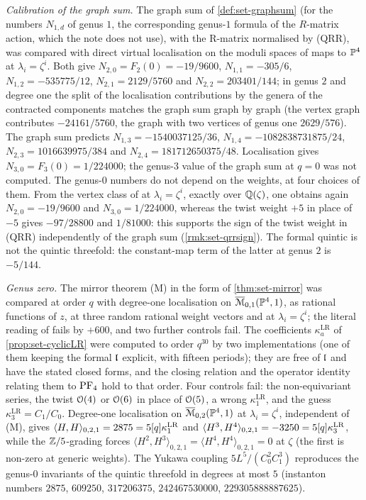 \emph{Calibration of the graph sum.} The graph sum of \cref{def:set-graphsum} (for the numbers $N_{1,d}$ of genus $1$, the corresponding genus-$1$ formula of the $R$-matrix action, which the note does not use), with the R-matrix normalised by (QRR), was compared with direct virtual localisation \cite{MR1666787} on the moduli spaces of maps to $\mathbb{P}^4$ at $\lambda_i=\zeta^i$. Both give $N_{2,0}=F_2(0)=-19/9600$, $N_{1,1}=-305/6$, $N_{1,2}=-535775/12$, $N_{2,1}=2129/5760$ and $N_{2,2}=203401/144$; in genus $2$ and degree one the split of the localisation contributions by the genera of the contracted components matches the graph sum graph by graph (the vertex graph contributes $-24161/5760$, the graph with two vertices of genus one $2629/576$). The graph sum predicts $N_{1,3}=-1540037125/36$, $N_{1,4}=-1082838731875/24$, $N_{2,3}=1016639975/384$ and $N_{2,4}=181712650375/48$. Localisation gives $N_{3,0}=F_3(0)=1/224000$; the genus-$3$ value of the graph sum at $q=0$ was not computed. The genus-$0$ numbers do not depend on the weights, at four choices of them. From the vertex class of \cite[(26)]{LP20} at $\lambda_i=\zeta^i$, exactly over $\mathbb{Q}(\zeta)$, one obtains again $N_{2,0}=-19/9600$ and $N_{3,0}=1/224000$, whereas the twist weight $+5$ in place of $-5$ gives $-97/28800$ and $1/81000$: this supports the sign of the twist weight in (QRR) independently of the graph sum (\cref{rmk:set-qrrsign}). The formal quintic is not the quintic threefold: the constant-map term of the latter at genus $2$ is $-5/144$.

\emph{Genus zero.} The mirror theorem (M) in the form of \cref{thm:set-mirror} was compared at order $q$ with degree-one localisation on $\overline{\mathcal M}_{0,1}(\mathbb{P}^4,1)$, as rational functions of $z$, at three random rational weight vectors and at $\lambda_i=\zeta^i$; the literal reading of \cite[Cor.~11.7]{MR1408320} fails by $+600$, and two further controls fail. The coefficients $\kappa^{\mathrm{LR}}_a$ of \cref{prop:set-cyclicLR} were computed to order $q^{30}$ by two implementations (one of them keeping the formal $\mathfrak{l}$ explicit, with fifteen periods); they are free of $\mathfrak{l}$ and have the stated closed forms, and the closing relation and the operator identity relating them to $\mathrm{PF}_{4}$ hold to that order. Four controls fail: the non-equivariant series, the twist $\mathcal{O}(4)$ or $\mathcal{O}(6)$ in place of $\mathcal{O}(5)$, a wrong $\kappa^{\mathrm{LR}}_1$, and the guess $\kappa^{\mathrm{LR}}_3=C_1/C_0$. Degree-one localisation on $\overline{\mathcal M}_{0,2}(\mathbb{P}^4,1)$ at $\lambda_i=\zeta^i$, independent of (M), gives $\langle H,H\rangle_{0,2,1}=2875=5[q]\kappa^{\mathrm{LR}}_1$ and $\langle H^3,H^4\rangle_{0,2,1}=-3250=5[q]\kappa^{\mathrm{LR}}_3$, while the $\mathbb{Z}/5$-grading forces $\langle H^2,H^3\rangle_{0,2,1}=\langle H^4,H^4\rangle_{0,2,1}=0$ at $\zeta$ (the first is non-zero at generic weights). The Yukawa coupling $5L^5/(C_0^2C_1^3)$ reproduces the genus-$0$ invariants of the quintic threefold in degrees at most $5$ (instanton numbers $2875$, $609250$, $317206375$, $242467530000$, $229305888887625$).

